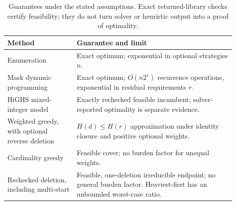 \begin{table}[htbp]
\caption{Guarantees under the stated assumptions. Exact returned-library checks certify feasibility; they do not turn solver or heuristic output into a proof of optimality.}
\label{tab:aor-algorithm-guarantees}
\centering\small
\begin{tabular}{@{}p{0.28\linewidth}p{0.64\linewidth}@{}}
\toprule
Method & Guarantee and limit \\
\midrule
Enumeration & Exact optimum; exponential in optional strategies \(n\). \\
Mask dynamic programming & Exact optimum; \(O(n2^r)\) recurrence operations, exponential in residual requirements \(r\). \\
HiGHS mixed-integer model & Exactly rechecked feasible incumbent; solver-reported optimality is separate evidence. \\
Weighted greedy, with optional reverse deletion & \(H(d)\le H(r)\) approximation under identity closure and positive optional weights. \\
Cardinality greedy & Feasible cover; no burden factor for unequal weights. \\
Rechecked deletion, including multi-start & Feasible, one-deletion irreducible endpoint; no general burden factor. Heaviest-first has an unbounded worst-case ratio. \\
\bottomrule
\end{tabular}
\end{table}
